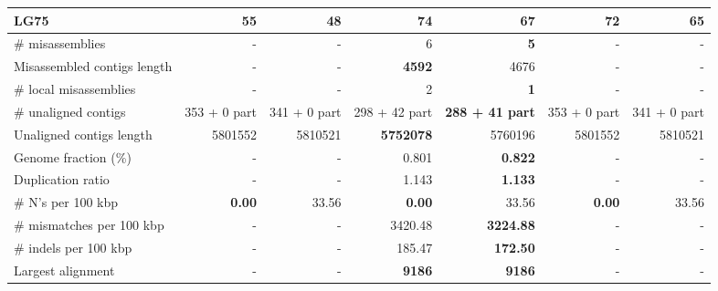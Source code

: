 \documentclass[12pt,a4paper]{article}
\begin{document}
\begin{table}[ht]
\begin{center}
\begin{tabular}{|l*{6}{|r}|}
LG75 & 55 & {\bf 48} & 74 & 67 & 72 & 65 \\ \hline
\# misassemblies & - & - & 6 & {\bf 5} & - & - \\ \hline
Misassembled contigs length & - & - & {\bf 4592} & 4676 & - & - \\ \hline
\# local misassemblies & - & - & 2 & {\bf 1} & - & - \\ \hline
\# unaligned contigs & 353 + 0 part & 341 + 0 part & 298 + 42 part & {\bf 288 + 41 part} & 353 + 0 part & 341 + 0 part \\ \hline
Unaligned contigs length & 5801552 & 5810521 & {\bf 5752078} & 5760196 & 5801552 & 5810521 \\ \hline
Genome fraction (\%) & - & - & 0.801 & {\bf 0.822} & - & - \\ \hline
Duplication ratio & - & - & 1.143 & {\bf 1.133} & - & - \\ \hline
\# N's per 100 kbp & {\bf 0.00} & 33.56 & {\bf 0.00} & 33.56 & {\bf 0.00} & 33.56 \\ \hline
\# mismatches per 100 kbp & - & - & 3420.48 & {\bf 3224.88} & - & - \\ \hline
\# indels per 100 kbp & - & - & 185.47 & {\bf 172.50} & - & - \\ \hline
Largest alignment & - & - & {\bf 9186} & {\bf 9186} & - & - \\ \hline
\end{tabular}
\end{center}
\end{table}
\end{document}

